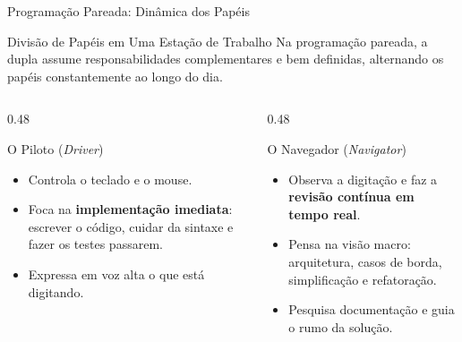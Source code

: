 \documentclass[aspectratio=169, 9pt]{beamer}
\begin{document}
\begin{frame}{Programação Pareada: Dinâmica dos Papéis}
  \begin{block}{Divisão de Papéis em Uma Estação de Trabalho}
    Na programação pareada, a dupla assume responsabilidades complementares e bem definidas, alternando os papéis constantemente ao longo do dia.
  \end{block}

  \vspace{0.2cm}

  \begin{columns}[T]
    \begin{column}{0.48\textwidth}
      \begin{exampleblock}{O Piloto (\textit{Driver})}
        \begin{itemize}
          \item Controla o teclado e o mouse.
          \item Foca na \textbf{implementação imediata}: escrever o código, cuidar da sintaxe e fazer os testes passarem.
          \item Expressa em voz alta o que está digitando.
        \end{itemize}
      \end{exampleblock}
    \end{column}

    \begin{column}{0.48\textwidth}
      \begin{alertblock}{O Navegador (\textit{Navigator})}
        \begin{itemize}
          \item Observa a digitação e faz a \textbf{revisão contínua em tempo real}.
          \item Pensa na visão macro: arquitetura, casos de borda, simplificação e refatoração.
          \item Pesquisa documentação e guia o rumo da solução.
        \end{itemize}
      \end{alertblock}
    \end{column}
  \end{columns}
\end{frame}
\end{document}

